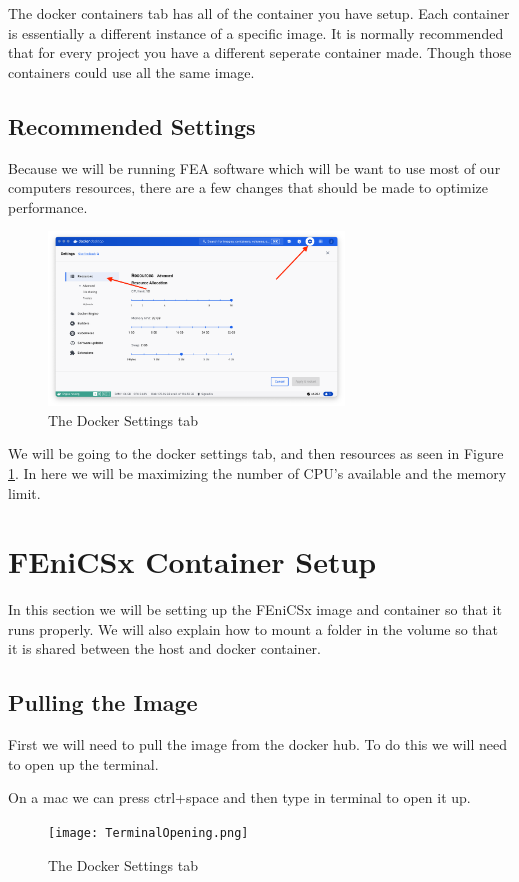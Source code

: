 \documentclass[final]{article}
\numberwithin{equation}{section}
\theoremstyle{remarkStyle}
\begin{document}
The docker containers tab has all of the container you have setup. Each container is essentially a different instance of a specific image. It is normally recommended that for every project you have a different seperate container made. Though those containers could use all the same image.

\subsection{Recommended Settings}

Because we will be running FEA software which will be want to use most of our computers resources, there are a few changes that should be made to optimize performance.


\begin{figure}[H]
  \centering
  \includegraphics[width=0.7\textwidth]{DockerSetup.png}
  \caption{ The Docker Settings tab}%
  \label{fig:docker_settings}%
\end{figure}

We will be going to the docker settings tab, and then resources as seen in Figure \ref{fig:docker_settings}.
In here we will be maximizing the number of CPU's available and the memory limit.
\section{FEniCSx Container Setup}
In this section we will be setting up the FEniCSx image and container so that it runs properly.
We will also explain how to mount a folder in the volume so that it is shared between the host and docker container.

\subsection{Pulling the Image}
First we will need to pull the image from the docker hub. To do this we will need to open up the terminal.

On a mac we can press ctrl+space and then type in terminal to open it up.
\begin{figure}[H]
  \centering
  \texttt{[image: TerminalOpening.png]}
  \caption{ The Docker Settings tab}%
  \label{fig:Terminal_open}%
\end{figure}
\end{document}
